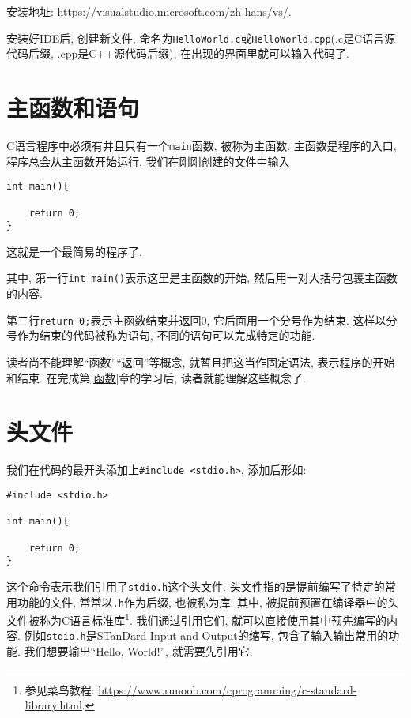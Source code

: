             安装地址: \href{https://visualstudio.microsoft.com/zh-hans/vs/}{https://visualstudio.microsoft.com/zh-hans/vs/}.

        安装好IDE后, 创建新文件, 命名为\texttt{HelloWorld.c}或\texttt{HelloWorld.cpp}(.c是C语言源代码后缀, .cpp是C++源代码后缀), 在出现的界面里就可以输入代码了.

    \section{主函数和语句} \label{主函数和语句}
        C语言程序中必须有并且只有一个\texttt{main}函数, 被称为主函数. 主函数是程序的入口, 程序总会从主函数开始运行. 我们在刚刚创建的文件中输入
\begin{lstlisting}
int main(){

    return 0;
}
\end{lstlisting}
        这就是一个最简易的程序了.

        其中, 第一行\texttt{int main()}表示这里是主函数的开始, 然后用一对大括号包裹主函数的内容.

        第三行\texttt{return 0;}表示主函数结束并返回0, 它后面用一个分号作为结束. 这样以分号作为结束的代码被称为语句, 不同的语句可以完成特定的功能.

        读者尚不能理解``函数''``返回''等概念, 就暂且把这当作固定语法, 表示程序的开始和结束. 在完成第\ref{函数}章的学习后, 读者就能理解这些概念了.

    \section{头文件} \label{头文件}
        我们在代码的最开头添加上\texttt{\#include <stdio.h>}, 添加后形如:
\begin{lstlisting}
#include <stdio.h>

int main(){

    return 0;
}
\end{lstlisting}

        这个命令表示我们引用了\texttt{stdio.h}这个头文件. 头文件指的是提前编写了特定的常用功能的文件, 常常以\texttt{.h}作为后缀, 也被称为库. 其中, 被提前预置在编译器中的头文件被称为C语言标准库\footnote{参见菜鸟教程: \href{https://www.runoob.com/cprogramming/c-standard-library.html}{https://www.runoob.com/cprogramming/c-standard-library.html}.}. 我们通过引用它们, 就可以直接使用其中预先编写的内容. 例如\texttt{stdio.h}是STanDard Input and Output的缩写, 包含了输入输出常用的功能. 我们想要输出``Hello, World!'', 就需要先引用它.

